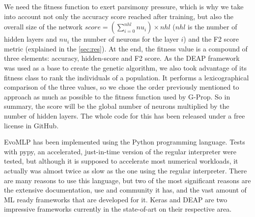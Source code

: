 \documentclass[conference]{IEEEtran}\usepackage[]{graphicx}\usepackage[]{color}
\begin{document}
We need the fitness function to exert parsimony pressure, which is why
we take into account not only the accuracy score reached after
training, but also the overall size of the network $score = (\sum_{i=0}^{nhl} nu_{i}) \times nhl$ ($nhl$ is the number of hidden layers and $nu_{i}$ the number
of neurons for the layer $i$) and the F2 score metric (explained in the
\autoref{sec:res}). At the end, the fitness value is a compound of
three elements: accuracy, hidden-score and F2 score. As the DEAP framework
\cite{deap-ga} was used as a base to create the genetic algorithm, we also
took advantage of its fitness class \cite{deap-fitness} to rank the individuals
of a population. It performs a lexicographical comparison of the three values,
so we chose the order previously mentioned to approach as much as possible to
the fitness function used by G-Prop.
%
%
%         
%
So in summary, the score will be the
global number of neurons multiplied by the number of hidden layers.
%
The whole code for this has been released under a free license in
GitHub. %

{\sf EvoMLP} has been implemented using the Python programming language. Tests with pypy, an accelerated, just-in-time version of the regular interpreter were tested, but although it is supposed to accelerate most numerical workloads, it actually was almost twice as slow as the one using the regular interpreter. There are
many reasons to use this language, but two of the most significant reasons are
the extensive documentation, use and community it has, and the vast amount of
ML ready frameworks that are developed for it. Keras and DEAP are two impressive
frameworks currently in the state-of-art on their respective area.
\end{document}

